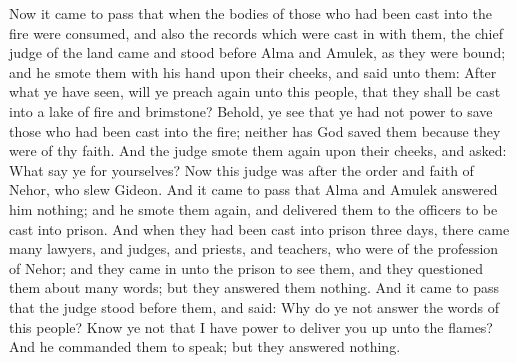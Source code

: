 Now it came to pass that when the bodies of those who had been cast into the fire were consumed, and also the records which were cast in with them, the chief judge of the land came and stood before Alma and Amulek, as they were bound; and he smote them with his hand upon their cheeks, and said unto them: After what ye have seen, will ye preach again unto this people, that they shall be cast into a lake of fire and brimstone?
\bverse \iffalse Behold, ye see that ye had not power to save those who had been cast into the fire; neither has God saved them because they were of thy faith. And the judge smote them again upon their cheeks, and asked: What say ye for yourselves? \fi
Behold, ye see that ye had not power to save those who had been cast into the fire; neither has God saved them because they were of thy faith. And the judge smote them again upon their cheeks, and asked: What say ye for yourselves?
\bverse \iffalse Now this judge was after the order and faith of Nehor, who slew Gideon. \fi
Now this judge was after the order and faith of Nehor, who slew Gideon.
\bverse \iffalse And it came to pass that Alma and Amulek answered him nothing; and he smote them again, and delivered them to the officers to be cast into prison. \fi
And it came to pass that Alma and Amulek answered him nothing; and he smote them again, and delivered them to the officers to be cast into prison.
\bverse \iffalse And when they had been cast into prison three days, there came many lawyers, and judges, and priests, and teachers, who were of the profession of Nehor; and they came in unto the prison to see them, and they questioned them about many words; but they answered them nothing. \fi
And when they had been cast into prison three days, there came many lawyers, and judges, and priests, and teachers, who were of the profession of Nehor; and they came in unto the prison to see them, and they questioned them about many words; but they answered them nothing.
\bverse \iffalse And it came to pass that the judge stood before them, and said: Why do ye not answer the words of this people? Know ye not that I have power to deliver you up unto the flames? And he commanded them to speak; but they answered nothing. \fi
And it came to pass that the judge stood before them, and said: Why do ye not answer the words of this people? Know ye not that I have power to deliver you up unto the flames? And he commanded them to speak; but they answered nothing.
\bverse \iffalse And it came to pass that they departed and went their ways, but came again on the morrow; and the judge also smote them again on their cheeks. And many came forth also, and smote them, saying: Will ye stand again and judge this people, and condemn our law? If ye have such great power why do ye not deliver yourselves? \fi
